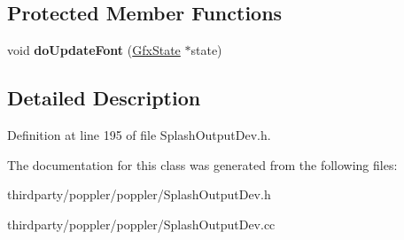 \subsection*{Protected Member Functions}
\begin{DoxyCompactItemize}
\item 
\mbox{\label{class_splash_output_dev_aca3c88c1afbdbaf774be3c596d76f26a}} 
void {\bfseries do\+Update\+Font} (\hyperlink{class_gfx_state}{Gfx\+State} $\ast$state)
\end{DoxyCompactItemize}


\subsection{Detailed Description}


Definition at line 195 of file Splash\+Output\+Dev.\+h.



The documentation for this class was generated from the following files\+:\begin{DoxyCompactItemize}
\item 
thirdparty/poppler/poppler/Splash\+Output\+Dev.\+h\item 
thirdparty/poppler/poppler/Splash\+Output\+Dev.\+cc\end{DoxyCompactItemize}
